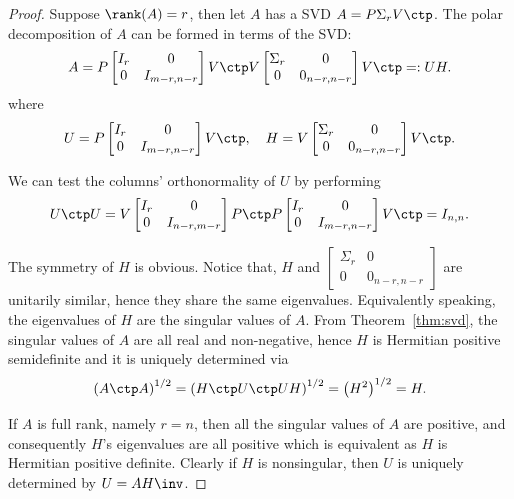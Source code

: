\documentclass{article}
\numberwithin{equation}{section} %
\begin{document}
\begin{proof}
Suppose $\rank(A) = r$, then let $A$ has a SVD $A = P\Sigma_r V\ctp$. The
polar decomposition of $A$ can be formed in terms of the SVD:
\begin{equation}
  \notag 
  A = P
  \begin{bmatrix}
    I_r & 0 \\
    0 & I_{m-r,n-r}
  \end{bmatrix}
  V\ctp V 
  \begin{bmatrix}
    \Sigma_r & 0 \\
    0 & 0_{n-r,n-r}
  \end{bmatrix}
  V\ctp =: UH.
\end{equation}
where
\begin{equation}
  \label{eq:expression-of-factors}
  U = P
  \begin{bmatrix}
    I_r & 0 \\
    0 & I_{m-r,n-r}
  \end{bmatrix}
  V\ctp
  ,\quad 
  H = 
  V 
  \begin{bmatrix}
    \Sigma_r & 0 \\
    0 & 0_{n-r,n-r}
  \end{bmatrix}
  V\ctp.
\end{equation}
    
We can test the columns' orthonormality of $U$ by performing
\begin{equation}
  \notag 
  U\ctp U = V
  \begin{bmatrix}
    I_r & 0 \\ 0 & I_{n - r, m-r}
  \end{bmatrix}
  P\ctp P
  \begin{bmatrix}
    I_r & 0 \\ 0 & I_{m-r,n-r}
  \end{bmatrix}
  V\ctp = I_{n,n}.
\end{equation}

The symmetry of $H$ is obvious. Notice that, $H$ and
$\begin{bmatrix} \Sigma_r & 0 \\ 0 & 0_{n-r,n-r}\end{bmatrix}$ are
unitarily similar, hence they share the same eigenvalues. Equivalently
speaking, the eigenvalues of $H$ are the singular values of $A$. From
Theorem~\ref{thm:svd}, the singular values of $A$ are all real and
non-negative, hence $H$ is Hermitian positive semidefinite and it is
uniquely determined via
\begin{equation}
  \left(A\ctp A\right)^{1/2} = \left(H\ctp U\ctp U H\right)^{1/2} = \left(H^2\right)^{1/2} = H.
\end{equation}

If $A$ is full rank, namely $r = n$, then all the singular values of $A$
are positive, and consequently $H$'s eigenvalues are all positive which is
equivalent as $H$ is Hermitian positive definite. Clearly if $H$ is
nonsingular, then $U$ is uniquely determined by $U = AH\inv$.
\end{proof}
\end{document}
